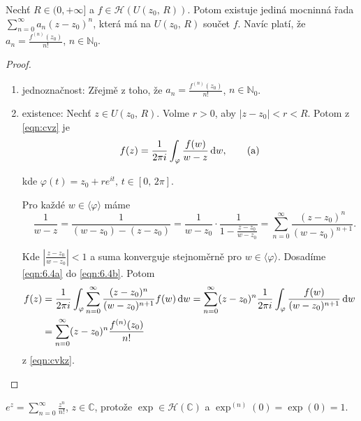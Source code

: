 \begin{theorem}
Nechť $R \in (0, +\infty]$ a $f \in \mathcal{H}(U(z_0,\,R))$. Potom existuje jediná mocninná řada $\sum\limits _{n=0} ^{\infty} a_n(z-z_0)^n$, která má na $U(z_0,\,R)$ součet $f$. Navíc platí, že $a_n=\frac{f^{(n)}(z_0)}{n!}$, $n \in \mathbb{N}_0$.
\end{theorem}

\begin{proof}
\begin{enumerate}
    \item jednoznačnost: Zřejmě z toho, že $a_n=\frac{f^{(n)}(z_0)}{n!}$, $n \in \mathbb{N}_0$.
    \item existence: Nechť $z \in U(z_0,\,R)$. Volme $r>0$, aby $|z-z_0|<r<R$. Potom z \cref{eqn:cvz} je
    \begin{equation}
        f(z)=\frac{1}{2 \pi i} \int_\varphi \frac{f(w)}{w-z} \mathop{}\!\mathrm{d} w,
        \tag{a}
        \label{eqn:6.4a}
    \end{equation}
    
    kde $\varphi(t)=z_0+re^{it} \text{, } t \in [0,\,2\pi]$.
    
    Pro každé $w \in \langle \varphi \rangle$ máme
    \begin{equation}
        \quad \frac{1}{w-z}=\frac{1}{(w-z_0)-(z-z_0)}=\frac{1}{w-z_0}\cdot\frac{1}{1-\frac{z-z_0}{w-z_0}}=\sum_{n=0}^\infty \frac{(z-z_0)^n}{(w-z_0)^{n+1}} \text{.}    
        \label{eqn:6.4b}
        \tag{b}
    \end{equation}
    
    Kde $|\frac{z-z_0}{w-z_0}|<1$ a suma konverguje stejnoměrně pro $w \in  \langle \varphi \rangle$. Dosadíme \cref{eqn:6.4a} do \cref{eqn:6.4b}. Potom
    \begin{equation*}
        \begin{split}
    f(z) &=\frac{1}{2 \pi i} \int_\varphi \sum_{n=0}^\infty \frac{(z-z_0)^n}{(w-z_0)^{n+1}} f(w) \mathop{}\!\mathrm{d} w= 
    \sum_{n=0}^\infty (z-z_0)^n \frac{1}{2 \pi i} \int_\varphi \frac{f(w)}{(w-z_0)^{n+1}} \mathop{}\!\mathrm{d} w \\
     &=\sum_{n=0}^\infty (z-z_0)^n \frac{f^{(n)}(z_0)}{n!}
     \end{split}
    \end{equation*}
    z \cref{eqn:cvkz}.
\end{enumerate}
\end{proof}

\begin{example}
$e^z=\sum\limits_{n=0}^\infty \frac{z^n}{n!}$, $z \in \mathbb{C}$, protože $\exp \in \mathcal{H}(\mathbb{C})$ a $\exp^{(n)}(0)=\exp(0)=1$.
\end{example}


